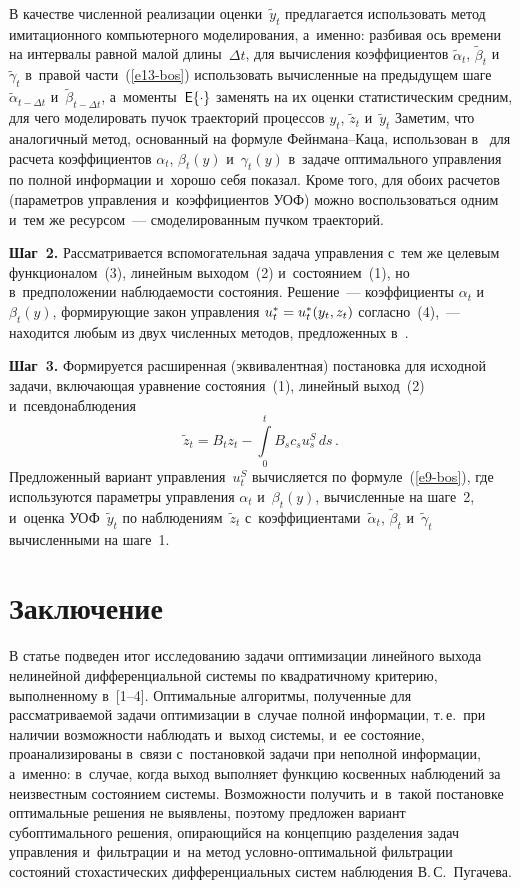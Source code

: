 \begin{multicols}{2}
     В качестве численной реализации оценки~$\tilde{y}_t$ предлагается 
использовать метод имитационного компьютерного  моделирования, 
а~именно: разбивая ось времени на интервалы равной малой длины~$\Delta 
t$, для вычисления коэффициентов $\tilde{\alpha}_t$, $\tilde{\beta}_t$ 
и~$\tilde{\gamma}_t$ в~правой части~(\ref{e13-bos}) использовать вычисленные 
на предыдущем шаге $\tilde{\alpha}_{t-\Delta t}$ и~$\tilde{\beta}_{t-\Delta t}$, 
а~моменты~${\sf E}\{\cdot\}$ заменять на их оценки статистическим средним, для 
чего моделировать пучок траекторий процессов $y_t$, $\tilde{z}_t$
и~$\tilde{y}_t$ 
Заметим, что аналогичный метод, основанный на формуле  
Фейн\-ма\-на--Ка\-ца, использован в~\cite{4-bos} для расчета коэффициентов 
$\alpha_t$, $\beta_t(y)$ и~$\gamma_t(y)$ в~задаче оптимального управления по 
полной информации и~хорошо себя показал. Кроме того, для обоих расчетов 
(параметров управления и~коэффициентов УОФ) можно воспользоваться 
одним и~тем же ресурсом~--- смоделированным пучком траекторий.
     
     \textbf{Шаг~2.} Рассматривается вспомогательная задача управления с~тем же 
целевым функционалом~(3), линейным выходом~(2) и~состоянием~(1), но 
в~предположении наблюдаемости состояния. Решение~--- коэффициенты 
$\alpha_t$ и~$\beta_t(y)$, формирующие закон управления $u_t^*\hm= u_t^*(y_t, 
z_t)$ согласно~(4),~--- находится любым из двух численных методов, 
предложенных в~\cite{2-bos, 4-bos}.
     
     \textbf{Шаг~3.} Формируется расширенная (эквивалентная) постановка для 
исходной задачи, вклю\-ча\-ющая уравнение состояния~(1), линейный 
выход~(2) и~псевдонаблюдения 
$$
\tilde{z}_t= B_tz_t- \int\limits_0^t 
B_s c_s u_s^S\,ds\,.
$$
 Предложенный вариант управления~$u_t^S$ вычисляется 
по формуле~(\ref{e9-bos}), где используются параметры управления 
$\alpha_t$ и~$\beta_t(y)$, вычисленные на шаге~2, и~оценка УОФ~$\tilde{y}_t$ 
по наблюдениям~$\tilde{z}_t$ с~коэффициентами~$\tilde{\alpha}_t$, 
$\tilde{\beta}_t$ и~$\tilde{\gamma}_t$ вычисленными на шаге~1.

\section{Заключение}

     В статье подведен итог исследованию задачи оптимизации линейного 
выхода нелинейной дифференциальной системы по квадратичному 
критерию, выполненному в~[1--4]. Оптимальные алгоритмы, полученные для 
рассматриваемой задачи оптимизации в~случае полной информации, т.\,е.\ 
при наличии возможности наблюдать и~выход сис\-те\-мы, и~ее состояние, 
проанализированы в~связи с~постановкой задачи при неполной информации, а~именно:
в~случае, когда выход выполняет функцию косвенных наблюдений за 
неизвестным состоянием системы. Возможности получить и~в~такой 
постановке оптимальные решения не выявлены, поэтому предложен вариант 
субоптимального решения, опирающийся на концепцию разделения задач 
управления и~фильтрации и~на метод услов\-но-оп\-ти\-маль\-ной 
фильт\-ра\-ции состояний стохастических дифференциальных систем наблюдения 
В.\,С.~Пугачева.
     

\end{multicols}
